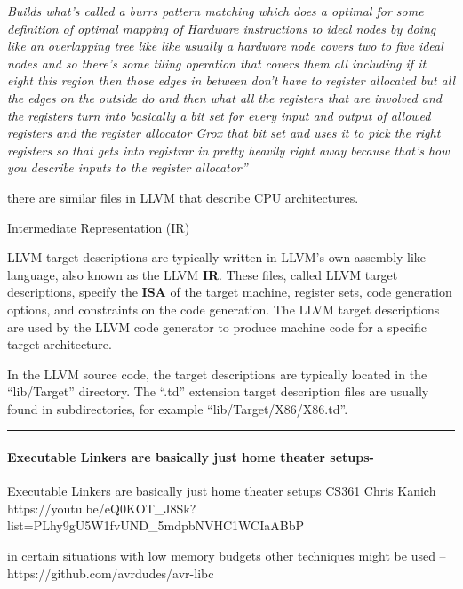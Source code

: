 \emph{Builds what's called a burrs pattern matching which does a optimal
for some definition of optimal mapping of Hardware instructions to ideal
nodes by doing like an overlapping tree like like usually a hardware
node covers two to five ideal nodes and so there's some tiling operation
that covers them all including if it eight this region then those edges
in between don't have to register allocated but all the edges on the
outside do and then what all the registers that are involved and the
registers turn into basically a bit set for every input and output of
allowed registers and the register allocator Grox that bit set and uses
it to pick the right registers so that gets into registrar in pretty
heavily right away because that's how you describe inputs to the
register allocator''}

there are similar files in LLVM that describe CPU architectures.

Intermediate Representation (IR)

LLVM target descriptions are typically written in LLVM's own
assembly-like language, also known as the LLVM \textbf{IR}. These files,
called LLVM target descriptions, specify the \textbf{ISA} of the target
machine, register sets, code generation options, and constraints on the
code generation. The LLVM target descriptions are used by the LLVM code
generator to produce machine code for a specific target architecture.

In the LLVM source code, the target descriptions are typically located
in the ``lib/Target'' directory. The ``.td'' extension target
description files are usually found in subdirectories, for example
``lib/Target/X86/X86.td''.

\begin{center}\rule{0.5\linewidth}{0.5pt}\end{center}

\hypertarget{executable-linkers-are-basically-just-home-theater-setups-}{%
\paragraph{Executable Linkers are basically just home theater
setups-}\label{executable-linkers-are-basically-just-home-theater-setups-}}

Executable Linkers are basically just home theater setups CS361 Chris
Kanich
https://youtu.be/eQ0KOT\_J8Sk?list=PLhy9gU5W1fvUND\_5mdpbNVHC1WCIaABbP

in certain situations with low memory budgets other techniques might be
used --https://github.com/avrdudes/avr-libc

